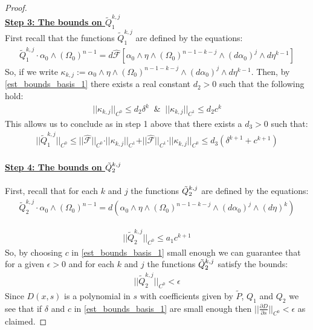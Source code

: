 \documentclass[10pt,a4paper]{amsart}
\begin{document}
\begin{proof}
\\
\textbf{\underline{Step 3: The bounds on $\tilde{Q}^{k,j}_1$}}
\\
First recall that the functions $\tilde{Q}^{k,j}_1$ are defined by the equations:
\begin{align}
         \tilde{Q}^{k,j}_1 \cdot \alpha_0 \wedge (\Omega_0)^{n-1} = d\hat{\mathcal{F}}[\alpha_0 \wedge \eta \wedge (\Omega_0)^{n-1-k-j} \wedge (d\alpha_0)^{j} \wedge d\eta^{k-1}]
\end{align}
So, if we write $\kappa_{k,j}:= \alpha_0 \wedge \eta \wedge (\Omega_0)^{n-1-k-j} \wedge (d\alpha_0)^{j} \wedge d\eta^{k-1}$. Then, by \eqref{est_bounds_basis_1} there exists a real constant $d_2>0$ such that the following hold:
\begin{align}
    \vert\vert\kappa_{k,j}\vert\vert_{C^0} \leq d_2 \delta^{k} \; \;  \& \;\; \vert\vert\kappa_{k,j}\vert\vert_{C^1} \leq d_2 c^{k}
\end{align}
This allows us to conclude as in step 1 above that there exists a $d_3>0$ such that:
\begin{align}
    \vert\vert\tilde{Q}^{k,j}_1\vert\vert_{C^0} \leq \vert\vert\hat{\mathcal{F}}\vert\vert_{C^0}\cdot \vert\vert\kappa_{k,j}\vert\vert_{C^1} + \vert\vert\hat{\mathcal{F}}\vert\vert_{C^1}\cdot \vert\vert\kappa_{k,j}\vert\vert_{C^0} \leq d_3(\delta^{k+1} + c^{k+1})
\end{align}
\\
\textbf{\underline{Step 4: The bounds on $\Tilde{Q}^{k,j}_2$}}
\\
\\
First, recall that for each $k$ and $j$ the functions $\Tilde{Q}^{k,j}_2$ are defined by the equations:
\begin{align}
        \tilde{Q}^{k,j}_2 \cdot \alpha_0 \wedge (\Omega_0)^{n-1} = d( \alpha_0 \wedge \eta  \wedge (\Omega_0)^{n-1-k-j} \wedge (d\alpha_0)^j \wedge  (d\eta)^{k})
    \end{align}

\begin{align}
    \vert\vert\tilde{Q}^{k,j}_2\vert\vert_{C^0} \leq a_1c^{k+1}
\end{align}
So, by choosing $c$ in \eqref{est_bounds_basis_1} small enough we can guarantee that for a given $\epsilon>0$ and for each $k$ and $j$ the functions $\Tilde{Q}^{k,j}_2$ satisfy the bounds:
\begin{align}
    \vert\vert\tilde{Q}^{k,j}_2\vert\vert_{C^0} < \epsilon
\end{align}
Since $D(x,s)$ is a polynomial in $s$ with coefficients given by $\tilde{P}$, $Q_1$ and $Q_2$ we see that if $\delta$ and $c$ in \eqref{est_bounds_basis_1} are small enough then $\vert\vert\frac{\partial D}{\partial s}\vert\vert_{C^0} < \epsilon$ as claimed. 
\end{proof}
\end{document}
